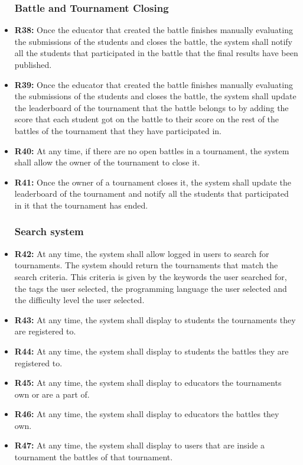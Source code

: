 \documentclass{article}
\begin{document}
\begin{itemize}
    \subsubsection*{Battle and Tournament Closing}

    \item \textbf{R38:} Once the educator that created the battle finishes manually evaluating the submissions of the students and closes the battle, the system shall notify all the students that participated in the battle that the final results have been published.
    \item \textbf{R39:} Once the educator that created the battle finishes manually evaluating the submissions of the students and closes the battle, the system shall update the leaderboard of the tournament that the battle belongs to by adding the score that each student got on the battle to their score on the rest of the battles of the tournament that they have participated in.
    \item \textbf{R40:} At any time, if there are no open battles in a tournament, the system shall allow the owner of the tournament to close it.
    \item \textbf{R41:} Once the owner of a tournament closes it, the system shall update the leaderboard of the tournament and notify all the students that participated in it that the tournament has ended.
    
    \subsubsection*{Search system}

    \item \textbf{R42:} At any time, the system shall allow logged in users to search for tournaments. The system should return the tournaments that match the search criteria. This criteria is given by the keywords the user searched for, the tags the user selected, the programming language the user selected and the difficulty level the user selected.
    \item \textbf{R43:} At any time, the system shall display to students the tournaments they are registered to.
    \item \textbf{R44:} At any time, the system shall display to students the battles they are registered to.
    \item \textbf{R45:} At any time, the system shall display to educators the tournaments own or are a part of.
    \item \textbf{R46:} At any time, the system shall display to educators the battles they own.
    \item \textbf{R47:} At any time, the system shall display to users that are inside a tournament the battles of that tournament.


\end{itemize}
\newpage
\end{document}

